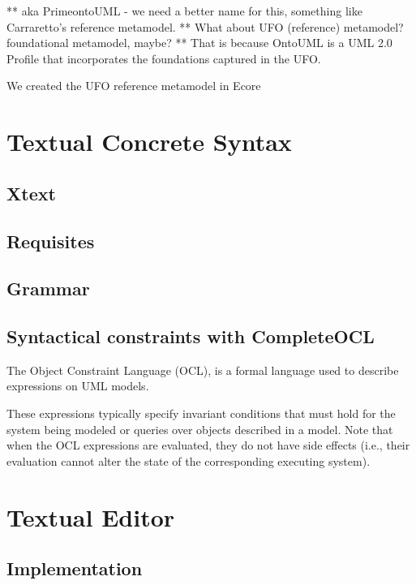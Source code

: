 \documentclass[
	10pt,				%
	oneside,
	a4paper,			%
	brazil,
	english
	]{abntex2}
\begin{document}

** aka PrimeontoUML - we need a better name for this, something like Carraretto's reference metamodel.
** What about UFO (reference) metamodel? foundational metamodel, maybe?
** That is because OntoUML is a UML 2.0 Profile that incorporates the foundations captured in the UFO.

We created the UFO reference metamodel in Ecore

\chapter{Textual Concrete Syntax}

\section{Xtext}

\section{Requisites}

\section{Grammar}

\section{Syntactical constraints with CompleteOCL}

The Object Constraint Language (OCL)\cite{OCL20}, is a formal language used to
describe expressions on UML models.

These expressions typically specify invariant conditions that must hold for the
system being modeled or queries over objects described in a model. Note that when
the OCL expressions are evaluated, they do not have side effects (i.e., their
evaluation cannot alter the state of the corresponding executing system).

\chapter{Textual Editor}

\section{Implementation}
\end{document}
